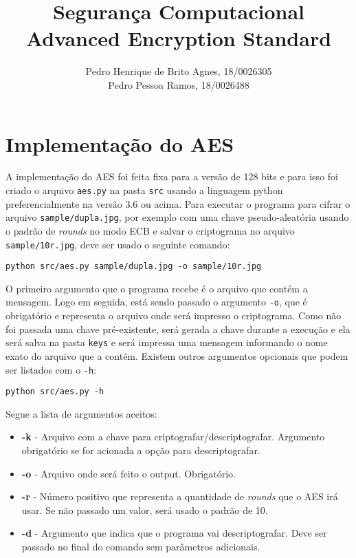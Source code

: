 \documentclass[12pt]{article}
\title{\textbf{Segurança Computacional\\ \Large{Advanced Encryption Standard}}}
\author{Pedro Henrique de Brito Agnes, 18/0026305 \\
Pedro Pessoa Ramos, 18/0026488}
\affil{Dep. Ciência da Computação - Universidade de Brasília (UnB) \vspace{-2ex}}
\date{}
\begin{document}
\maketitle

\section{Implementação do AES}
A implementação do AES foi feita fixa para a versão de 128 bits e para isso foi criado o arquivo \texttt{aes.py} na pasta \texttt{src} usando a linguagem python preferencialmente na versão 3.6 ou acima. Para executar o programa para cifrar o arquivo \texttt{sample/dupla.jpg}, por exemplo com uma chave pseudo-aleatória usando o padrão de \textit{rounds} no modo ECB e salvar o criptograma no arquivo \texttt{sample/10r.jpg}, deve ser usado o seguinte comando:

\begin{lstlisting}
python src/aes.py sample/dupla.jpg -o sample/10r.jpg
\end{lstlisting}

O primeiro argumento que o programa recebe é o arquivo que contém a mensagem. Logo em seguida, está sendo passado o argumento \texttt{-o}, que é obrigatório e representa o arquivo onde será impresso o criptograma. Como não foi passada uma chave pré-existente, será gerada a chave durante a execução e ela será salva na pasta \texttt{keys} e será impressa uma mensagem informando o nome exato do arquivo que a contém. Existem outros argumentos opcionais que podem ser listados com o \texttt{-h}:

\begin{lstlisting}
python src/aes.py -h
\end{lstlisting}

Segue a lista de argumentos aceitos:
\begin{itemize}
    \item \textbf{-k} - Arquivo com a chave para criptografar/descriptografar. Argumento obrigatório se for acionada a opção para descriptografar.
    \item \textbf{-o} - Arquivo onde será feito o output. Obrigatório.
    \item \textbf{-r} - Número positivo que representa a quantidade de \textit{rounds} que o AES irá usar. Se não passado um valor, será usado o padrão de 10.
    \item \textbf{-d} - Argumento que indica que o programa vai descriptografar. Deve ser passado no final do comando sem parâmetros adicionais.
\end{itemize}
\end{document}
